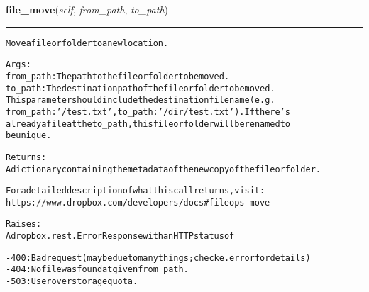     \label{lib:dropbox:DropboxClient:file_move}

    \vspace{0.5ex}

\hspace{.8\funcindent}\begin{boxedminipage}{\funcwidth}

    \raggedright \textbf{file\_move}(\textit{self}, \textit{from\_path}, \textit{to\_path})

    \vspace{-1.5ex}

    \rule{\textwidth}{0.5\fboxrule}
\setlength{\parskip}{2ex}
\begin{alltt}
Move a file or folder to a new location.

Args:
    from\_path: The path to the file or folder to be moved.
    to\_path: The destination path of the file or folder to be moved.
    This parameter should include the destination filename (e.g.
    from\_path: '/test.txt', to\_path: '/dir/test.txt'). If there's
    already a file at the to\_path, this file or folder will be renamed to
    be unique.

Returns:
    A dictionary containing the metadata of the new copy of the file or folder.

    For a detailed description of what this call returns, visit:
    https://www.dropbox.com/developers/docs\#fileops-move

Raises:
    A dropbox.rest.ErrorResponse with an HTTP status of

    - 400: Bad request (may be due to many things; check e.error for details)
    - 404: No file was found at given from\_path.
    - 503: User over storage quota.
\end{alltt}

\setlength{\parskip}{1ex}
    \end{boxedminipage}

    \label{lib:dropbox:DropboxClient:metadata}

    \vspace{0.5ex}

